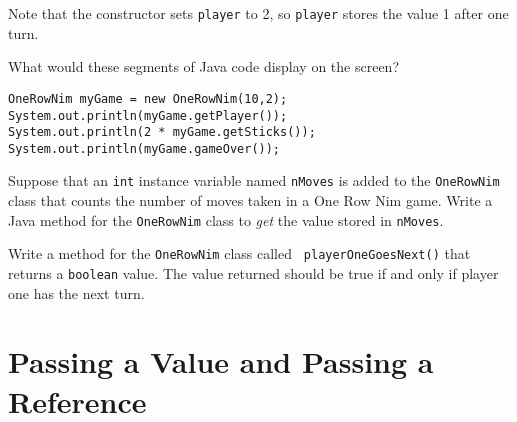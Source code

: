 \noindent Note that the constructor sets {\tt player} to 2, so
{\tt player} stores the value 1 after one turn.

\label{self-study-exercises}
\begin{SSTUDY}
\item  What would these segments of Java
code display on the screen?

\begin{jjjlisting}
\begin{lstlisting}
OneRowNim myGame = new OneRowNim(10,2);
System.out.println(myGame.getPlayer());
System.out.println(2 * myGame.getSticks());
System.out.println(myGame.gameOver());
\end{lstlisting}
\end{jjjlisting}


\item  Suppose that an {\tt int} instance variable named {\tt nMoves} is added
to the {\tt OneRowNim} class that counts the number of moves taken in a
One Row Nim game.  Write a Java method for the {\tt OneRowNim} class
to {\it get}
the value stored in {\tt nMoves}.

\item  Write a method for the {\tt OneRowNim} class called {\tt
player\-One\-Goes\-Next()}
that returns a {\tt boolean} value.  The value returned should be
true if and only
if player one has the next turn.

\end{SSTUDY}

\section{Passing a Value and Passing a Reference}
\label{sec-passby}


